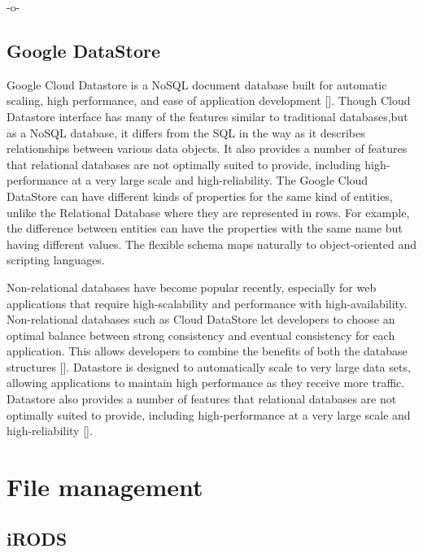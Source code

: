      -o-


\subsection{Google DataStore}

Google Cloud Datastore is a NoSQL document database built for
automatic scaling, high performance, and ease of application
development [\cite{www-google-datastore}]. Though Cloud Datastore
interface has many of the features similar to traditional
databases,but as a NoSQL database, it differs from the SQL in the way
as it describes relationships between various data objects. It also
provides a number of features that relational databases are not
optimally suited to provide, including high-performance at a very
large scale and high-reliability. The Google Cloud DataStore can have
different kinds of properties for the same kind of entities, unlike
the Relational Database where they are represented in rows. For
example, the difference between entities can have the properties with
the same name but having different values. The flexible schema maps
naturally to object-oriented and scripting languages.

Non-relational databases have become popular recently, especially for
web applications that require high-scalability and performance with
high-availability. Non-relational databases such as Cloud DataStore
let developers to choose an optimal balance between strong consistency
and eventual consistency for each application. This allows developers
to combine the benefits of both the database
structures [\cite{www-google-datastore-2}].  Datastore is designed to
automatically scale to very large data sets, allowing applications to
maintain high performance as they receive more traffic. Datastore also
provides a number of features that relational databases are not
optimally suited to provide, including high-performance at a very
large scale and high-reliability [\cite{www-google-datastore}].

\section{File management}
\label{S:o-file-management}


\subsection{iRODS}

